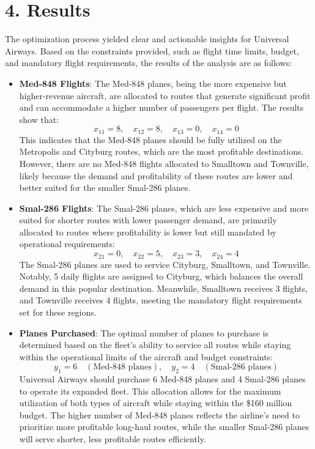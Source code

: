 \section*{4. Results}

The optimization process yielded clear and actionable insights for Universal Airways. Based on the constraints provided, such as flight time limits, budget, and mandatory flight requirements, the results of the analysis are as follows:

\begin{itemize}
    \item \textbf{Med-848 Flights}: 
    The Med-848 planes, being the more expensive but higher-revenue aircraft, are allocated to routes that generate significant profit and can accommodate a higher number of passengers per flight. The results show that:
    \[
    x_{11} = 8, \quad x_{12} = 8, \quad x_{13} = 0, \quad x_{14} = 0
    \]
    This indicates that the Med-848 planes should be fully utilized on the Metropolis and Cityburg routes, which are the most profitable destinations. However, there are no Med-848 flights allocated to Smalltown and Townville, likely because the demand and profitability of these routes are lower and better suited for the smaller Smal-286 planes.
    
    \item \textbf{Smal-286 Flights}:
    The Smal-286 planes, which are less expensive and more suited for shorter routes with lower passenger demand, are primarily allocated to routes where profitability is lower but still mandated by operational requirements:
    \[
    x_{21} = 0, \quad x_{22} = 5, \quad x_{23} = 3, \quad x_{24} = 4
    \]
    The Smal-286 planes are used to service Cityburg, Smalltown, and Townville. Notably, 5 daily flights are assigned to Cityburg, which balances the overall demand in this popular destination. Meanwhile, Smalltown receives 3 flights, and Townville receives 4 flights, meeting the mandatory flight requirements set for these regions.

    \item \textbf{Planes Purchased}:
    The optimal number of planes to purchase is determined based on the fleet's ability to service all routes while staying within the operational limits of the aircraft and budget constraints:
    \[
    y_1 = 6 \quad (\text{Med-848 planes}), \quad y_2 = 4 \quad (\text{Smal-286 planes})
    \]
    Universal Airways should purchase 6 Med-848 planes and 4 Smal-286 planes to operate its expanded fleet. This allocation allows for the maximum utilization of both types of aircraft while staying within the \$160 million budget. The higher number of Med-848 planes reflects the airline's need to prioritize more profitable long-haul routes, while the smaller Smal-286 planes will serve shorter, less profitable routes efficiently.


\end{itemize}
